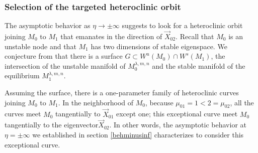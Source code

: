 \documentclass[a4paper,11pt]{article}
\numberwithin{step}{dummy}
\begin{document}
\subsubsection{Selection of the targeted heteroclinic orbit}\label{sec:summarize} 
The asymptotic behavior as $\eta \rightarrow \pm\infty$ suggests to look for a heteroclinic orbit joining $M_0$ to $M_1$ that emanates in the direction of $\vec{X}_{02}$. 
Recall that $M_0$ is an unstable node and that $M_1$ has two dimensions of stable eigenspace. We conjecture from that there is a surface $G \subset W^u(M_0) \cap W^s(M_1)$, the intersection of the unstable manifold of $M_0^{ \lambda, m,n}$ and the stable manifold of the equilibrium $M_1^{ \lambda, m,n}$.

Assuming the surface, there is a one-parameter family of heteroclinic curves joining $M_0$ to $M_1$. 
In the neighborhood of $M_0$, because $\mu_{01}=1<2=\mu_{02}$, all the curves meet $M_0$ tangentially to $\vec{X}_{01}$ except one; 
this exceptional curve meet $M_0$ tangentially to the eigenvector$\vec{X}_{02}$. 
In other words, the asymptotic behavior at $\eta=\pm\infty$ we established in section \ref{behminusinf} characterizes to consider this exceptional curve.
\end{document}
